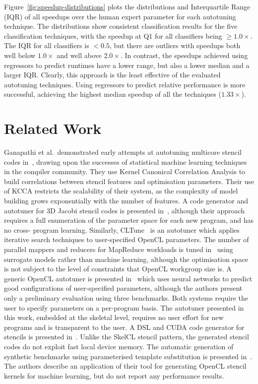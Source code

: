 \documentclass[preprint,nonatbib,10pt,nocopyrightspace]{sigplanconf}
\begin{document}
Figure~\ref{fig:speedup-distributions} plots the distributions and Interquartile
Range (IQR) of all speedups over the human expert parameter for each autotuning
technique. The distributions show consistent classification results for the five
classification techniques, with the speedup at Q1 for all classifiers being $\ge
1.0\times$. The IQR for all classifiers is $< 0.5$, but there are outliers with
speedups both well below $1.0\times$ and well above $2.0\times$. In contrast,
the speedups achieved using regressors to predict runtimes have a lower range,
but also a lower median and a larger IQR. Clearly, this approach is the least
effective of the evaluated autotuning techniques. Using regressors to predict
relative performance is more successful, achieving the highest median speedup of
all the techniques ($1.33\times$).


\section{Related Work}\label{sec:related}

Ganapathi et al.\ demonstrated early attempts at autotuning multicore stencil
codes in~\cite{Ganapathi2009}, drawing upon the successes of statistical machine
learning techniques in the compiler community. They use Kernel Canonical
Correlation Analysis to build correlations between stencil features and
optimisation parameters. Their use of KCCA restricts the scalability of their
system, as the complexity of model building grows exponentially with the number
of features. A code generator and autotuner for 3D Jacobi stencil codes is
presented in~\cite{Zhang2013a}, although their approach requires a full
enumeration of the parameter space for each new program, and has no cross-
program learning. Similarly, CLTune~\cite{Nugteren2015} is an autotuner which
applies iterative search techniques to user-specified OpenCL parameters. The
number of parallel mappers and reducers for MapReduce workloads is tuned
in~\cite{Johnston2015a} using surrogate models rather than machine learning,
although the optimisation space is not subject to the level of constraints that
OpenCL workgroup size is. A generic OpenCL autotuner is presented
in~\cite{Falch2015} which uses neural networks to predict good configurations of
user-specified parameters, although the authors present only a preliminary
evaluation using three benchmarks. Both systems require the user to specify
parameters on a per-program basis. The autotuner presented in this work,
embedded at the skeletal level, requires no user effort for new programs and is
transparent to the user. A DSL and CUDA code generator for stencils is presented
in~\cite{Kamil2010}. Unlike the SkelCL stencil pattern, the generated stencil
codes do not exploit fast local device memory. The automatic generation of
synthetic benchmarks using parameterised template substitution is presented
in~\cite{Chiu2015}. The authors describe an application of their tool for
generating OpenCL stencil kernels for machine learning, but do not report any
performance results.
\end{document}
